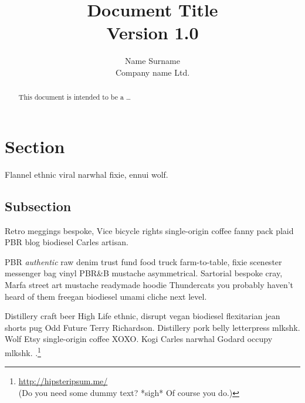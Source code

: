 \documentclass[11pt]{article}
\title{\textbf{Document Title}\\\normalsize Version 1.0}
\author{Name Surname\\
        Company name Ltd.}
\date{}
\begin{document}
\maketitle
\thispagestyle{empty}
\begin{abstract}
This document is intended to be a \dots
\end{abstract}
\clearpage

\setcounter{tocdepth}{4}
\tableofcontents
{}

\clearpage

\section{Section}
Flannel ethnic viral narwhal fixie, ennui wolf.

\subsection{Subsection}
Retro meggings bespoke, Vice bicycle rights single-origin coffee fanny pack plaid PBR blog biodiesel Carles artisan.

PBR \emph{authentic} raw denim trust fund food truck farm-to-table, fixie scenester messenger bag vinyl PBR\&B mustache asymmetrical. Sartorial bespoke cray, Marfa street art mustache readymade hoodie Thundercats you probably haven't heard of them freegan biodiesel umami cliche next level.

Distillery craft beer High Life ethnic, disrupt vegan biodiesel flexitarian jean shorts pug Odd Future Terry Richardson. Distillery pork belly letterpress mlkshk. Wolf Etsy single-origin coffee XOXO. Kogi Carles narwhal Godard occupy mlkshk.
.\footnote{\url{http://hipsteripsum.me/}\\(Do you need some dummy text? *sigh* Of course you do.)}

\end{document}

